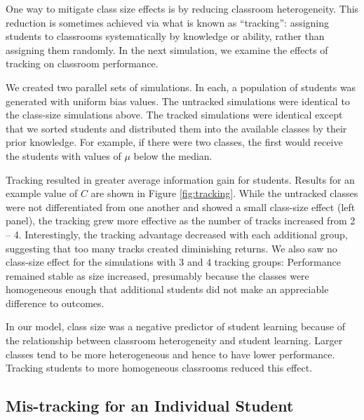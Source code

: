 \documentclass[10pt,letterpaper]{article}
\begin{document}
One way to mitigate class size effects is by reducing classroom heterogeneity. This reduction is sometimes achieved via what is known as ``tracking'': assigning students to classrooms systematically by knowledge or ability, rather than assigning them randomly. In the next simulation, we examine the effects of tracking on classroom performance. 

We created two parallel sets of simulations. In each, a population of students was generated with uniform bias values. The untracked simulations were identical to the class-size simulations above. The tracked simulations were identical except that we sorted students and distributed them into the available classes by their prior knowledge. For example, if there were two classes, the first would receive the students with values of $\mu$ below the median. 

Tracking resulted in greater average information gain for students. Results for an example value of $C$ are shown in Figure \ref{fig:tracking}. While the untracked classes were not differentiated from one another and showed a small class-size effect (left panel), the tracking grew more effective as the number of tracks increased from 2 -- 4. Interestingly, the tracking advantage decreased with each additional group, suggesting that too many tracks created diminishing returns. We also saw no class-size effect for the simulations with 3 and 4 tracking groups: Performance remained stable as size increased, presumably because the classes were homogeneous enough that additional students did not make an appreciable difference to outcomes.  

In our model, class size was a negative predictor of student learning because of the relationship between classroom heterogeneity and student learning. Larger classes tend to be more heterogeneous and hence to have lower performance. Tracking students to more homogeneous classrooms reduced this effect.

\subsection{Mis-tracking for an Individual Student}
\end{document}
